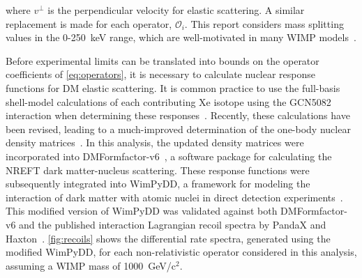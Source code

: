 \documentclass[reprint, showpacs,
preprintnumbers,
amsmath,amssymb,
aps, floatfix,
superscriptaddress,
prd, nofootinbib]{revtex4-1}
\begin{document}
where $v^\perp$ is the perpendicular velocity for elastic scattering. 
A similar replacement is made for each operator, $\mathcal{O}_i$. 
This report considers mass splitting values in the 0-250~keV range, which are well-motivated in many WIMP models~\cite{Smith_2001, Barello_2014}.
\par
Before experimental limits can be translated into bounds on the operator coefficients of \autoref{eq:operators}, it is necessary to calculate nuclear response functions for DM elastic scattering. 
It is common practice to use the full-basis shell-model calculations of each contributing Xe isotope using the GCN5082 interaction when determining these responses~\cite{MENENDEZ2009139}. 
Recently, these calculations have been revised, leading to a much-improved determination of the one-body nuclear density matrices~\cite{haxton_unpublished}.
In this analysis, the updated density matrices were incorporated into DMFormfactor-v6~\cite{Anand:MathematicaEFT}, a software package for calculating the NREFT dark matter-nucleus scattering. 
These response functions were subsequently integrated into WimPyDD, a framework for modeling the interaction of dark matter with atomic nuclei in direct detection experiments~\cite{Jeong_2022}. 
This modified version of WimPyDD was validated against both DMFormfactor-v6 and the published interaction Lagrangian recoil spectra by PandaX and Haxton~\cite{PandaX2:SD_EFT_2019}.
\autoref{fig:recoils} shows the differential rate spectra, generated using the modified WimPyDD, for each non-relativistic operator considered in this analysis, assuming a WIMP mass of 1000~GeV/c$^2$.
\end{document}
